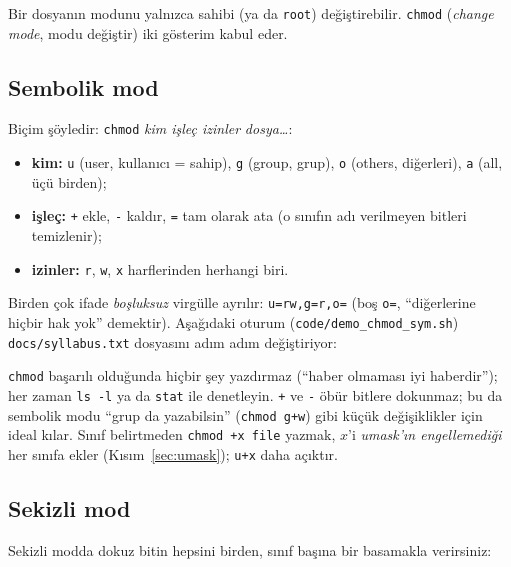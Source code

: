 \documentclass[11pt,a4paper]{article}
\newcommand{\cmd}[1]{\texttt{#1}}
\begin{document}
Bir dosyanın modunu yalnızca sahibi (ya da \texttt{root}) değiştirebilir. \cmd{chmod} (\emph{change mode}, modu değiştir) iki gösterim kabul eder.

\subsection{Sembolik mod}

Biçim şöyledir: \texttt{chmod} \emph{kim işleç izinler} \emph{dosya\dots}:
\begin{itemize}
  \item \textbf{kim:} \texttt{u} (user, kullanıcı = sahip), \texttt{g} (group, grup), \texttt{o} (others, diğerleri), \texttt{a} (all, üçü birden);
  \item \textbf{işleç:} \texttt{+} ekle, \texttt{-} kaldır, \texttt{=} tam olarak ata (o sınıfın adı verilmeyen bitleri temizlenir);
  \item \textbf{izinler:} \texttt{r}, \texttt{w}, \texttt{x} harflerinden herhangi biri.
\end{itemize}
Birden çok ifade \emph{boşluksuz} virgülle ayrılır: \texttt{u=rw,g=r,o=} (boş \texttt{o=}, ``diğerlerine hiçbir hak yok'' demektir). Aşağıdaki oturum (\cmd{code/demo\_chmod\_sym.sh}) \texttt{docs/syllabus.txt} dosyasını adım adım değiştiriyor:



\cmd{chmod} başarılı olduğunda hiçbir şey yazdırmaz (``haber olmaması iyi haberdir''); her zaman \cmd{ls -l} ya da \cmd{stat} ile denetleyin. \texttt{+} ve \texttt{-} öbür bitlere dokunmaz; bu da sembolik modu ``grup da yazabilsin'' (\texttt{chmod g+w}) gibi küçük değişiklikler için ideal kılar. Sınıf belirtmeden \cmd{chmod +x file} yazmak, $x$'i \emph{umask'ın engellemediği} her sınıfa ekler (Kısım~\ref{sec:umask}); \texttt{u+x} daha açıktır.

\subsection{Sekizli mod}

Sekizli modda dokuz bitin hepsini birden, sınıf başına bir basamakla verirsiniz:
\end{document}

